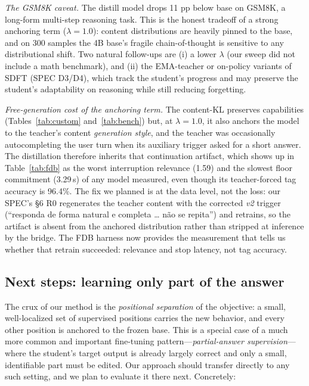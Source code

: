 \documentclass[conference]{IEEEtran}
\begin{document}
\emph{The GSM8K caveat.} The distill model drops 11 pp below base on GSM8K, a
long-form multi-step reasoning task. This is the honest tradeoff of a strong
anchoring term ($\lambda{=}1.0$): content distributions are heavily pinned to the
base, and on 300 samples the 4B base's fragile chain-of-thought is sensitive to any
distributional shift. Two natural follow-ups are (i) a lower $\lambda$ (our sweep did
not include a math benchmark), and (ii) the EMA-teacher or on-policy variants of SDFT
(SPEC D3/D4), which track the student's progress and may preserve the student's
adaptability on reasoning while still reducing forgetting.

\emph{Free-generation cost of the anchoring term.} The content-KL preserves
capabilities (Tables~\ref{tab:custom} and~\ref{tab:bench}) but, at
$\lambda{=}1.0$, it also anchors the model to the teacher's content
\emph{generation style}, and the teacher was occasionally autocompleting the user
turn when its auxiliary trigger asked for a short answer. The distillation therefore
inherits that continuation artifact, which shows up in
Table~\ref{tab:fdb} as the worst interruption relevance (1.59) and the slowest
floor commitment (3.29\,s) of any model measured, even though its teacher-forced
tag accuracy is 96.4\%. The fix we planned is at the data level, not the loss: our
SPEC's \S6 R0 regenerates the teacher content with the corrected \emph{v2} trigger
(``responda de forma natural e completa \ldots{} não se repita'') and retrains, so
the artifact is absent from the anchored distribution rather than stripped at
inference by the bridge. The FDB harness now provides the measurement that tells us
whether that retrain succeeded: relevance and stop latency, not tag accuracy.

\subsection{Next steps: learning only part of the answer}
The crux of our method is the \emph{positional separation} of the objective: a small,
well-localized set of supervised positions carries the new behavior, and every other
position is anchored to the frozen base. This is a special case of a much more common
and important fine-tuning pattern---\emph{partial-answer supervision}---where the
student's target output is already largely correct and only a small, identifiable
part must be edited. Our approach should transfer directly to any such setting, and
we plan to evaluate it there next. Concretely:
\end{document}

